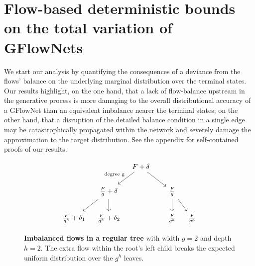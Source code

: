 \documentclass{article}
\theoremstyle{plain}
\theoremstyle{definition}
\theoremstyle{remark}
\theoremstyle{remark}
\begin{document}


\section{Flow-based deterministic bounds on the total variation of GFlowNets} \label{sec:flows} 

We start our analysis by quantifying the consequences of a deviance from the flows' balance on the underlying marginal distribution over the terminal states. Our results highlight, on the one hand, that a lack of flow-balance upstream in the generative process is more damaging to the overall distributional accuracy of a GFlowNet than an equivalent imbalance nearer the terminal states; on the other hand, that a disruption of the detailed balance condition in a single edge may be catastrophically propagated within the network and severely damage the approximation to the target distribution. See the appendix for self-contained proofs of our results. 

\begin{figure}[t]
    \center 
    \def\spacing{-15pt}
\[\begin{tikzcd}
	&[\spacing]&[\spacing] {F+\delta} \\
	&[\spacing] {\frac{F}{g}+\delta} &[\spacing]&[\spacing]&[\spacing] {\frac{F}{g}} \\
    {\frac{F}{g^h}+\delta_1} &[\spacing] {\frac{F}{g^h}+\delta_2} &[\spacing]&[\spacing] %
    &[\spacing] {\frac{F}{g^h}} &[\spacing] {\frac{F}{g^h}} %
    \arrow["{\text{degree g}}", swap, from=1-3, to=2-2]
	\arrow[from=1-3, to=2-5]
	\arrow[from=2-5, to=3-6]
	\arrow[from=2-5, to=3-5]
	\arrow[from=2-2, to=3-1]
	\arrow[from=2-2, to=3-2] 
\end{tikzcd}\]
\caption{\textbf{Imbalanced flows in a regular tree} with width $g = 2$ and depth $h = 2$. The extra flow within the root's left child breaks the expected uniform distribution over the $g^{h}$ leaves.}
    \label{fig:a} 
\end{figure}
\end{document}
